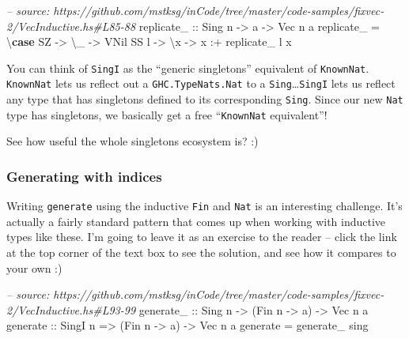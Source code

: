 \documentclass[]{article}
\newenvironment{Shaded}{}{}
\newcommand{\KeywordTok}[1]{\textcolor[rgb]{0.00,0.44,0.13}{\textbf{#1}}}
\newcommand{\DataTypeTok}[1]{\textcolor[rgb]{0.56,0.13,0.00}{#1}}
\newcommand{\CommentTok}[1]{\textcolor[rgb]{0.38,0.63,0.69}{\textit{#1}}}
\newcommand{\OtherTok}[1]{\textcolor[rgb]{0.00,0.44,0.13}{#1}}
\newcommand{\FunctionTok}[1]{\textcolor[rgb]{0.02,0.16,0.49}{#1}}
\newcommand{\NormalTok}[1]{#1}
\begin{document}
\begin{Shaded}
\begin{Highlighting}[]
\CommentTok{-- source: https://github.com/mstksg/inCode/tree/master/code-samples/fixvec-2/VecInductive.hs#L85-88}
\OtherTok{replicate_ ::} \DataTypeTok{Sing}\NormalTok{ n }\OtherTok{->}\NormalTok{ a }\OtherTok{->} \DataTypeTok{Vec}\NormalTok{ n a}
\NormalTok{replicate_ }\FunctionTok{=}\NormalTok{ \textbackslash{}}\KeywordTok{case}
    \DataTypeTok{SZ}   \OtherTok{->}\NormalTok{ \textbackslash{}_ }\OtherTok{->} \DataTypeTok{VNil}
    \DataTypeTok{SS}\NormalTok{ l }\OtherTok{->}\NormalTok{ \textbackslash{}x }\OtherTok{->}\NormalTok{ x }\FunctionTok{:+}\NormalTok{ replicate_ l x}
\end{Highlighting}
\end{Shaded}

You can think of \texttt{SingI} as the ``generic singletons'' equivalent of
\texttt{KnownNat}. \texttt{KnownNat} lets us reflect out a
\texttt{GHC.TypeNats.Nat} to a \texttt{Sing}\ldots{}\texttt{SingI} lets us
reflect any type that has singletons defined to its corresponding \texttt{Sing}.
Since our new \texttt{Nat} type has singletons, we basically get a free
``\texttt{KnownNat} equivalent''!

See how useful the whole singletons ecosystem is? :)

\subsubsection{Generating with indices}\label{generating-with-indices-1}

Writing \texttt{generate} using the inductive \texttt{Fin} and \texttt{Nat} is
an interesting challenge. It's actually a fairly standard pattern that comes up
when working with inductive types like these. I'm going to leave it as an
exercise to the reader -- click the link at the top corner of the text box to
see the solution, and see how it compares to your own :)

\begin{Shaded}
\begin{Highlighting}[]
\CommentTok{-- source: https://github.com/mstksg/inCode/tree/master/code-samples/fixvec-2/VecInductive.hs#L93-99}
\OtherTok{generate_ ::} \DataTypeTok{Sing}\NormalTok{ n }\OtherTok{->}\NormalTok{ (}\DataTypeTok{Fin}\NormalTok{ n }\OtherTok{->}\NormalTok{ a) }\OtherTok{->} \DataTypeTok{Vec}\NormalTok{ n a}
\OtherTok{generate ::} \DataTypeTok{SingI}\NormalTok{ n }\OtherTok{=>}\NormalTok{ (}\DataTypeTok{Fin}\NormalTok{ n }\OtherTok{->}\NormalTok{ a) }\OtherTok{->} \DataTypeTok{Vec}\NormalTok{ n a}
\NormalTok{generate }\FunctionTok{=}\NormalTok{ generate_ sing}
\end{Highlighting}
\end{Shaded}
\end{document}
